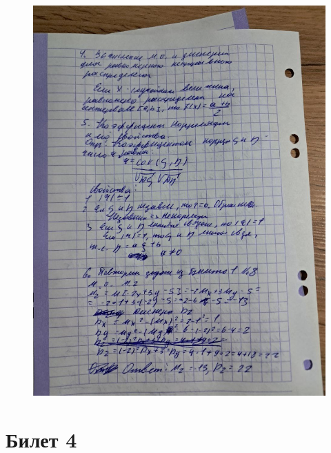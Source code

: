\documentclass{article}
\begin{document}
\begin{figure}[H]
    \centering
    \includegraphics[width=1\linewidth]{photo_5323477539961828016_y.jpg}
\end{figure}


\section{Билет 4}
\end{document}
